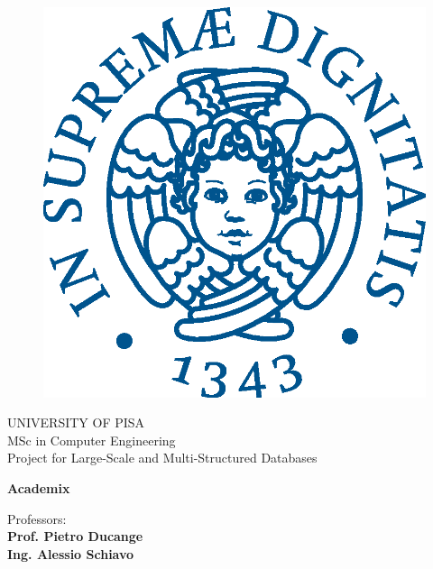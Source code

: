 \begin{titlepage}
\begin{figure}[!htb]
    \centering
    \includegraphics[keepaspectratio=true,scale=0.5]{images/Frontespizio/cherubinFrontespizio.eps}
\end{figure}

\begin{center}
    \LARGE{UNIVERSITY OF PISA}
    \vspace{5mm}
    \\ \large{MSc in Computer Engineering}
    \vspace{5mm}
    \\ \LARGE{Project for Large-Scale and Multi-Structured Databases}
\end{center}

\vspace{15mm}
\begin{center}
    {\LARGE{\bf Academix}}
    
    
\end{center}
\vspace{30mm}

\begin{minipage}[t]{0.47\textwidth}
	{\large{Professors:}{\normalsize\vspace{3mm}\bf\\ \large{Prof. Pietro Ducange}}{\normalsize\vspace{3mm}
               \bf\\ \large{Ing. Alessio Schiavo }}}


\end{minipage}
\end{titlepage}

